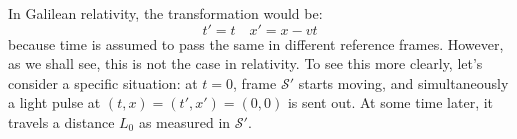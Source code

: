 \begin{center}
\end{center}
In Galilean relativity, the transformation would be:
\[
	t' = t \quad x' = x - vt
\]
because time is assumed to pass the same in different reference frames. However, as we shall see, this is not
the case in relativity. To see this more clearly, let's consider a specific situation: at \( t = 0 \), frame
\( \mathcal{S}' \) starts moving, and simultaneously a light pulse at \( (t, x) = (t', x') = (0, 0) \) is
sent out. At some time later, it travels a distance \( L_0 \) as measured in \( \mathcal{S}' \). 
 
